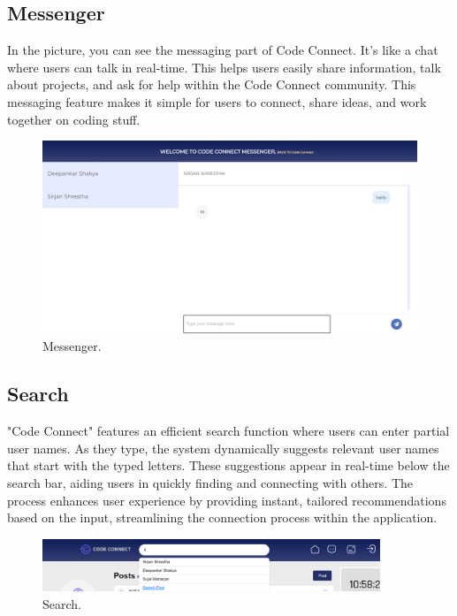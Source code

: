 \subsection{Messenger}
In the picture, you can see the messaging part of Code Connect. It's like a chat where users can talk in real-time. This helps users easily share information, talk about projects, and ask for help within the Code Connect community. This messaging feature makes it simple for users to connect, share ideas, and work together on coding stuff.
\begin{figure}[ht]
    \centering
    \includegraphics[width=1\textwidth]{Outcome-ss/messenger-full-block.png}
    \caption{Messenger.}
    \label{fig:Messenger}
\end{figure}

\subsection{Search}
"Code Connect" features an efficient search function where users can enter partial user names. As they type, the system dynamically suggests relevant user names that start with the typed letters. These suggestions appear in real-time below the search bar, aiding users in quickly finding and connecting with others. The process enhances user experience by providing instant, tailored recommendations based on the input, streamlining the connection process within the application.
\begin{figure}[ht]
    \centering
    \includegraphics[width=0.9\textwidth]{Outcome-ss/search-bar.png}
    \caption{Search.}
    \label{fig:Search}
\end{figure}

